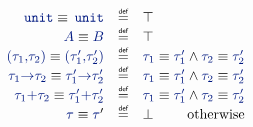 \[
\begin{array}{r l l}
  \stunit \equiv \stunit & \eqdef & \top \\
  \source{A} \equiv \source{B} & \eqdef & \top \\
  \spair{\staui}{\stauii} \equiv
  \spair{\source{\tau_1'}}{\source{\tau_2'}}
  & \eqdef & \staui \equiv \source{\tau_1'} \wedge \stauii \equiv \source{\tau_2'}  \\
  \sarrow{\staui}{\stauii} \equiv \sarrow{\source{\tau_1'}}{\source{\tau_2'}}
  & \eqdef & \staui \equiv \source{\tau_1'} \wedge \stauii \equiv \source{\tau_2'}  \\
  \ssum{\staui}{\stauii} \equiv \ssum{\source{\tau_1'}}{\source{\tau_2'}}
  & \eqdef & \staui \equiv \source{\tau_1'} \wedge \stauii \equiv \source{\tau_2'}  \\
  \stau \equiv \stau' 
  & \eqdef & \bot \hfill \text{otherwise}  \\

\end{array}
\]
